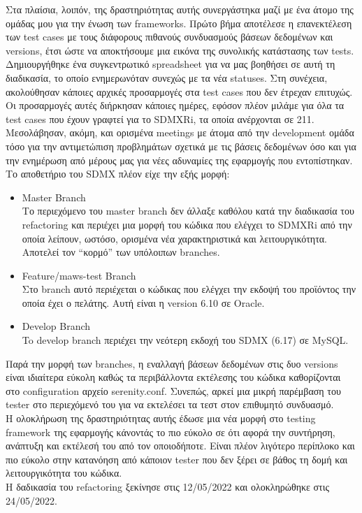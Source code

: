 Στα πλαίσια, λοιπόν, της δραστηριότητας αυτής συνεργάστηκα μαζί με ένα άτομο της ομάδας μου για την ένωση των frameworks. Πρώτο βήμα αποτέλεσε η επανεκτέλεση των test 
cases με τους διάφορους πιθανούς συνδυασμούς βάσεων δεδομένων και versions, έτσι ώστε να αποκτήσουμε μια εικόνα της συνολικής κατάστασης των tests. Δημιουργήθηκε ένα 
συγκεντρωτικό spreadsheet για να μας βοηθήσει σε αυτή τη διαδικασία, το οποίο ενημερωνόταν συνεχώς με τα νέα statuses. Στη συνέχεια, ακολούθησαν κάποιες αρχικές προσαρμογές στα test cases που δεν έτρεχαν επιτυχώς. 
Οι προσαρμογές αυτές διήρκησαν κάποιες ημέρες, εφόσον πλέον μιλάμε για όλα τα test cases που έχουν γραφτεί για το SDMXRi, τα οποία ανέρχονται σε 211. Μεσολάβησαν, ακόμη, και ορισμένα meetings με άτομα από 
την development ομάδα τόσο για την αντιμετώπιση προβλημάτων σχετικά με τις βάσεις δεδομένων όσο και για την ενημέρωση από μέρους μας για νέες αδυναμίες της εφαρμογής που εντοπίστηκαν. Το αποθετήριο 
του SDMX πλέον είχε την εξής μορφή:
\begin{itemize}
    \item Master Branch\\ Το περιεχόμενο του master branch δεν άλλαξε καθόλου κατά την διαδικασία του refactoring και περιέχει μια μορφή του κώδικα που ελέγχει το SDMXRi από την οποία λείπουν, ωστόσο, ορισμένα 
    νέα χαρακτηριστικά και λειτουργικότητα. Αποτελεί τον ``κορμό'' των υπόλοιπων branches.
    \item Feature/maws-test Branch\\ Στο branch αυτό περιέχεται ο κώδικας που ελέγχει την εκδοψή του προϊόντος την οποία έχει ο πελάτης. Αυτή είναι η version 6.10 σε Oracle.
	\item Develop Branch\\ To develop branch περιέχει την νεότερη εκδοχή του SDMX (6.17) σε MySQL.
\end{itemize}
Παρά την μορφή των branches, η εναλλαγή βάσεων δεδομένων στις δυο versions είναι ιδιαίτερα εύκολη καθώς τα περιβάλλοντα εκτέλεσης του κώδικα καθορίζονται στο configuration αρχείο serenity.conf. 
Συνεπώς, αρκεί μια μικρή παρέμβαση του tester στο περιεχόμενό του για να εκτελέσει τα τεστ στον επιθυμητό συνδυασμό.\\
Η ολοκλήρωση της δραστηριότητας αυτής έδωσε μια νέα μορφή στο testing framework της εφαρμογής κάνοντάς το πιο εύκολο σε ότι αφορά την συντήρηση, ανάπτυξη και εκτέλεσή του από τον οποιοδήποτε. Είναι πλέον λιγότερο 
περίπλοκο και πιο εύκολο στην κατανόηση από κάποιον tester που δεν ξέρει σε βάθος τη δομή και λειτουργικότητα του κώδικα.\\
Η δαδικασία του refactoring ξεκίνησε στις 12/05/2022 και ολοκληρώθηκε στις 24/05/2022.


